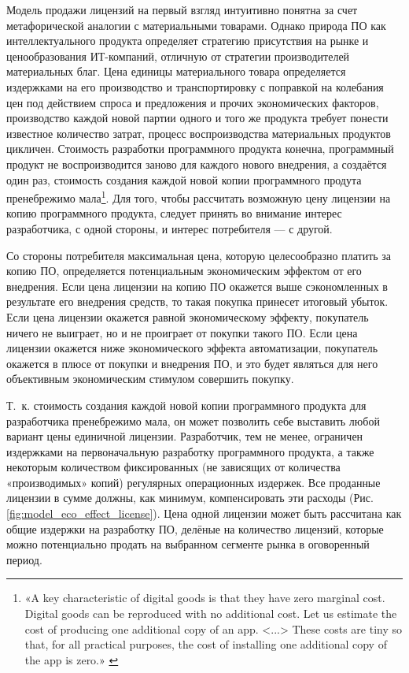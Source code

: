 \documentclass{article}
\begin{document}
Модель продажи лицензий на первый взгляд интуитивно понятна за счет метафорической аналогии с материальными товарами. Однако природа ПО как интеллектуального продукта определяет стратегию присутствия на рынке и ценообразования ИТ-компаний, отличную от стратегии производителей материальных благ. Цена единицы материального товара определяется издержками на его производство и транспортировку с поправкой на колебания цен под действием спроса и предложения и прочих экономических факторов, производство каждой новой партии одного и того же продукта требует понести известное количество затрат, процесс воспроизводства материальных продуктов цикличен. Стоимость разработки программного продукта конечна, программный продукт не воспроизводится заново для каждого нового внедрения, а создаётся один раз, стоимость создания каждой новой копии программного продута пренебрежимо мала\footnote{«A key characteristic of digital goods is that they have zero marginal cost. Digital goods can be reproduced with no additional cost. Let us estimate the cost of producing one additional copy of an app. <...> These costs are tiny so that, for all practical purposes, the cost of installing one additional copy of the app is zero.» \cite{introToDigital}}. Для того, чтобы рассчитать возможную цену лицензии на копию программного продукта, следует принять во внимание интерес разработчика, с одной стороны, и интерес потребителя — с другой.

Со стороны потребителя максимальная цена, которую целесообразно платить за копию ПО, определяется потенциальным экономическим эффектом от его внедрения. Если цена лицензии на копию ПО окажется выше сэкономленных в результате его внедрения средств, то такая покупка принесет итоговый убыток. Если цена лицензии окажется равной экономическому эффекту, покупатель ничего не выиграет, но и не проиграет от покупки такого ПО. Если цена лицензии окажется ниже экономического эффекта автоматизации, покупатель окажется в плюсе от покупки и внедрения ПО, и это будет являться для него объективным экономическим стимулом совершить покупку.

Т.~к. стоимость создания каждой новой копии программного продукта для разработчика пренебрежимо мала, он может позволить себе выставить любой вариант цены единичной лицензии. Разработчик, тем не менее, ограничен издержками на первоначальную разработку программного продукта, а также некоторым количеством фиксированных (не зависящих от количества «производимых» копий) регулярных операционных издержек. Все проданные лицензии в сумме должны, как минимум, компенсировать эти расходы (Рис. \ref{fig:model_eco_effect_license}). Цена одной лицензии может быть рассчитана как общие издержки на разработку ПО, делёные на количество лицензий, которые можно потенциально продать на выбранном сегменте рынка в оговоренный период.
\end{document}
